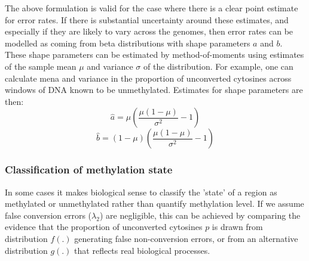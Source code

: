 \documentclass[twocolumn,twoside,lettersize]{article}
\begin{document}
The above formulation is valid for the case where there is a clear point estimate for error rates.
If there is substantial uncertainty around these estimates, and especially if they are likely to vary across the genomes, then error rates can be modelled as coming from beta distributions with shape parameters $a$ and $b$.
These shape parameters can be estimated by method-of-moments using estimates of the sample mean $\mu$ and variance $\sigma$ of the distribution.
For example, one can calculate mena and variance in the proportion of unconverted cytosines across windows of DNA known to be unmethylated.
Estimates for shape parameters are then:
\begin{equation}
    \hat{a} = \mu(\frac{\mu(1-\mu)}{\sigma^2}-1)
    \label{eqn:beta-a}
\end{equation}
\begin{equation}
    \hat{b} = (1-\mu)(\frac{\mu(1-\mu)}{\sigma^2}-1) 
    \label{eqn:beta-b}
\end{equation}

\subsubsection{Classification of methylation state} \label{sec:meth-state}

In some cases it makes biological sense to classify the 'state' of a region as methylated or unmethylated rather than quantify methylation level.
If we assume false conversion errors ($\lambda_2$) are negligible, this can be achieved by comparing the evidence that the proportion of unconverted cytosines $p$ is drawn from distribution $f(.)$ generating false non-conversion errors, or from an alternative distribution $g(.)$ that reflects real biological processes.
\end{document}
